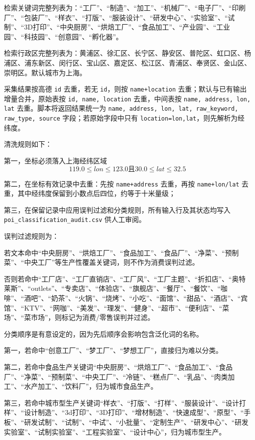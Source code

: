 \documentclass[aps,prl,reprint,superscriptaddress,floatfix,nofootinbib,longbibliography,amsmath,amssymb]{revtex4-2}
\begin{document}
检索关键词完整列表为：``工厂''、``制造''、``加工''、``机械厂''、``电子厂''、``印刷厂''、``包装厂''、``样衣''、``打版''、``服装设计''、``研发中心''、``实验室''、``试制''、``3D打印''、``中央厨房''、``烘焙工厂''、``食品加工''、``产业园''、``工业园''、``科技园''、``创意园''、``孵化器''。

检索行政区完整列表为：黄浦区、徐汇区、长宁区、静安区、普陀区、虹口区、杨浦区、浦东新区、闵行区、宝山区、嘉定区、松江区、青浦区、奉贤区、金山区、崇明区。默认城市为上海。

采集结果按高德 \texttt{id} 去重，若无 \texttt{id}，则按 \texttt{name+location} 去重；默认与已有输出增量合并，原始表按 \texttt{id, name, location} 去重，中间表按 \texttt{name, address, lon, lat} 去重。脚本将返回结果统一为 \texttt{name, address, lon, lat, raw\_keyword, raw\_type, source} 字段；若原始字段中只有 \texttt{location=lon,lat}，则先解析为经纬度。

清洗规则如下：

第一，坐标必须落入上海经纬区域 $$119.0\leq lon\leq123.0 \text{且} 30.0\leq lat\leq32.5$$

第二，在坐标有效记录中去重：先按 \texttt{name+address} 去重，再按 \texttt{name+lon/lat} 去重，其中经纬度保留到小数点后四位，约等于十米量级；

第三，在保留记录中应用误判过滤和分类规则，所有输入行及其状态均写入 \texttt{poi\_classification\_audit.csv} 供人工审阅。

误判过滤规则为：

若文本命中``中央厨房''、``烘焙工厂''、``食品加工''、``食品厂''、``净菜''、``预制菜''、``中央工厂''等生产性覆盖关键词，则不作为消费误判过滤。

否则若命中``工厂店''、``工厂直销店''、``工厂风''、``工厂主题''、``折扣店''、``奥特莱斯''、``outlets''、``专卖店''、``体验店''、``旗舰店''、``餐厅''、``餐饮''、``咖啡''、``酒吧''、``奶茶''、``火锅''、``烧烤''、``小吃''、``面馆''、``甜品''、``酒店''、``宾馆''、``KTV''、``网咖''、``美发''、``理发''、``健身''、``超市''、``便利店''、``菜场''、``菜市场''，则标记为消费/零售误判并过滤。

分类顺序是有意设定的，因为先后顺序会影响包含泛化词的名称。

第一，若命中``创意工厂''、``梦工厂''、``梦想工厂''，直接归为难以分类。

第二，若命中食品生产关键词``中央厨房''、``烘焙工厂''、``食品加工''、``食品厂''、``净菜''、``预制菜''、``中央工厂''、``冷链''、``糕点厂''、``乳品''、``肉类加工''、``水产加工''、``饮料厂''，归为城市食品生产。

第三，若命中城市型生产关键词``样衣''、``打版''、``打样''、``服装设计''、``设计打样''、``设计制造''、``3d打印''、``3D打印''、``增材制造''、``快速成型''、``原型''、``手板''、``研发试制''、``试制''、``中试''、``小批量''、``定制生产''、``研发中心''、``研发实验室''、``试制实验室''、``工程实验室''、``设计中心''，归为城市型生产。
\end{document}
